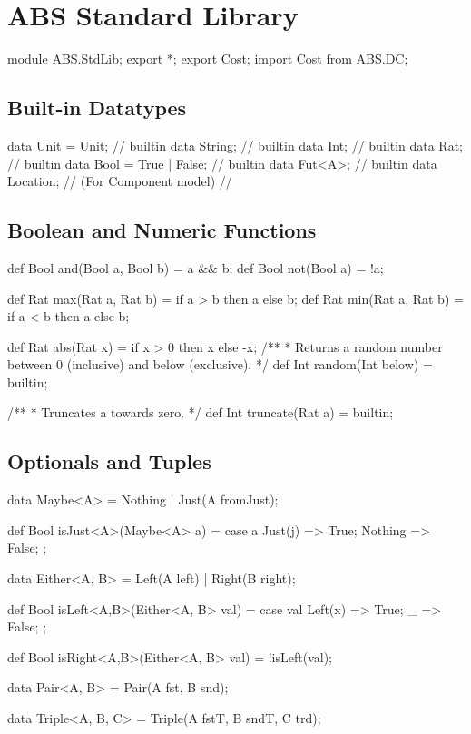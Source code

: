 \chapter{ABS Standard Library}\label{ch:absstdlib}
%


\begin{abscode}
module ABS.StdLib;
export *;
export Cost;
import Cost from ABS.DC;
\end{abscode}

\section{Built-in Datatypes}

\begin{abscode}
data Unit = Unit;               // builtin  
data String;                    // builtin  
data Int;                       // builtin
data Rat;                       // builtin
data Bool = True | False;       // builtin
data Fut<A>;                    // builtin
data Location;                  // (For Component model) //
\end{abscode}

\section{Boolean and Numeric Functions}

\begin{abscode}
def Bool and(Bool a, Bool b) = a && b;
def Bool not(Bool a) = !a;

def Rat max(Rat a, Rat b) = if a > b then a else b;
def Rat min(Rat a, Rat b) = if a < b then a else b;
    
def Rat abs(Rat x) = if x > 0 then x else -x;
/**
 * Returns a random number between 0 (inclusive) and below (exclusive).
 */
def Int random(Int below) = builtin;

/**
 * Truncates a towards zero.
 */
def Int truncate(Rat a) = builtin;
\end{abscode}

\section{Optionals and Tuples}

\begin{abscode}
data Maybe<A> = Nothing | Just(A fromJust);

def Bool isJust<A>(Maybe<A> a) = 
    case a { Just(j) => True; Nothing => False; };

data Either<A, B> = Left(A left) | Right(B right);

def Bool isLeft<A,B>(Either<A, B> val) = 
    case val { Left(x) => True; _ => False; };
    
def Bool isRight<A,B>(Either<A, B> val) = !isLeft(val);


data Pair<A, B> = Pair(A fst, B snd); 

data Triple<A, B, C> = Triple(A fstT, B sndT, C trd); 
\end{abscode}

